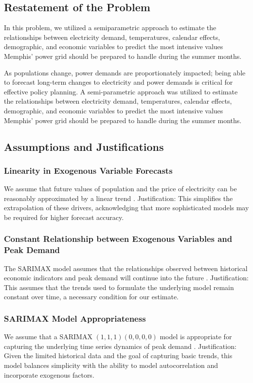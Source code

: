 \documentclass[12pt]{article}
\begin{document}
\subsection{Restatement of the Problem}
\par In this problem, we utilized a semiparametric approach to estimate the relationships between electricity demand, temperatures, calendar effects, demographic, and economic variables to predict the most intensive values Memphis’ power grid should be prepared to handle during the summer months.
\par As populations change, power demands are proportionately impacted; being able to forecast long-term changes to electricity and power demands is critical for effective policy planning. A semi-parametric approach was utilized to estimate the relationships between electricity demand, temperatures, calendar effects, demographic, and economic variables to predict the most intensive values Memphis' power grid should be prepared to handle during the summer months. 

\subsection{Assumptions and Justifications}

\subsubsection{Linearity in Exogenous Variable Forecasts}
We assume that future values of population and the price of electricity can be reasonably approximated by a linear trend \cite{Cohen2010}. 
Justification: This simplifies the extrapolation of these drivers, acknowledging that more sophisticated models may be required for higher forecast accuracy.

\subsubsection{Constant Relationship between Exogenous Variables and Peak Demand}
The SARIMAX model assumes that the relationships observed between historical economic indicators and peak demand will continue into the future \cite{HyndmanFan}.
Justification: This assumes that the trends used to formulate the underlying model remain constant over time, a necessary condition for our estimate.

\subsubsection{SARIMAX Model Appropriateness}
We assume that a SARIMAX $(1,1,1)(0,0,0,0)$ model is appropriate for capturing the underlying time series dynamics of peak demand \cite{Box1976}.
Justification: Given the limited historical data and the goal of capturing basic trends, this model balances simplicity with the ability to model autocorrelation and incorporate exogenous factors.
\end{document}
